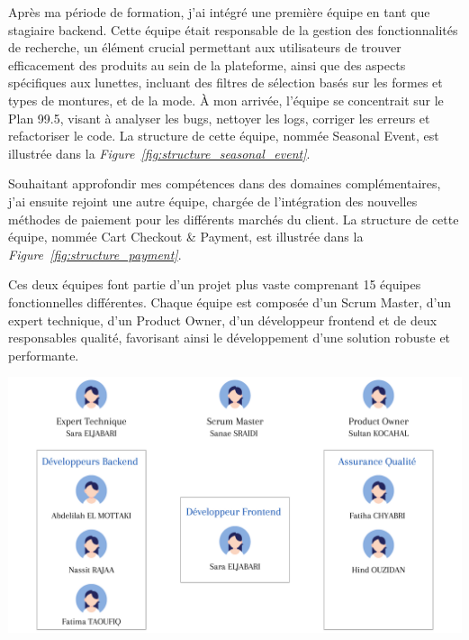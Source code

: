 Après ma période de formation, j’ai intégré une première équipe en tant que stagiaire backend. Cette équipe était responsable de la gestion des fonctionnalités de recherche, un élément crucial permettant aux utilisateurs de trouver efficacement des produits au sein de la plateforme, ainsi que des aspects spécifiques aux lunettes, incluant des filtres de sélection basés sur les formes et types de montures, et de la mode. À mon arrivée, l'équipe se concentrait sur le Plan 99.5, visant à analyser les bugs, nettoyer les logs, corriger les erreurs et refactoriser le code. La structure de cette équipe, nommée Seasonal Event, est illustrée dans la \textit{Figure~\ref{fig:structure_seasonal_event}}.

Souhaitant approfondir mes compétences dans des domaines complémentaires, j'ai ensuite rejoint une autre équipe, chargée de l’intégration des nouvelles méthodes de paiement pour les différents marchés du client. La structure de cette équipe, nommée Cart Checkout \& Payment, est illustrée dans la \textit{Figure~\ref{fig:structure_payment}}.

Ces deux équipes font partie d'un projet plus vaste comprenant 15 équipes fonctionnelles différentes. Chaque équipe est composée d'un Scrum Master, d'un expert technique, d'un Product Owner, d'un développeur frontend et de deux responsables qualité, favorisant ainsi le développement d'une solution robuste et performante.

\begin{center}
    \centering
    \includegraphics[width=19cm]{Figures/Seasonal Event Team.png}
    \label{fig:structure_seasonal_event}
\end{center}

